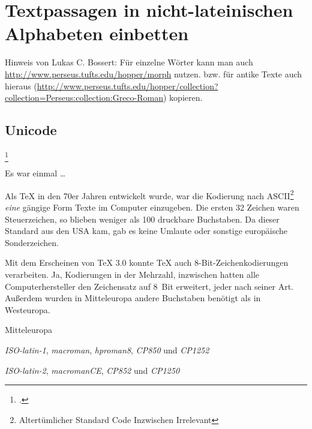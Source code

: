 \chapter{Textpassagen in nicht-lateinischen Alphabeten einbetten}

Hinweis von Lukas C. Bossert:
Für einzelne Wörter kann man auch \url{http://www.perseus.tufts.edu/hopper/morph} nutzen.
bzw. für antike Texte auch hieraus (\url{http://www.perseus.tufts.edu/hopper/collection?collection=Perseus:collection:Greco-Roman}) kopieren.

\section{Unicode}\label{sec:unicode}
\footcite{kielhorn:dtk2014}


\noindent Es war einmal \dots

Als \TeX{} in den 70er Jahren entwickelt wurde, war die Kodierung nach 
ASCII\footnote{Altertümlicher Standard Code Inzwischen Irrelevant} \emph{eine}
gängige Form Texte im Computer einzugeben. 
Die ersten 32 Zeichen waren Steuerzeichen, so blieben weniger als 100 druckbare Buchstaben.
Da dieser Standard aus den USA kam, gab es keine Umlaute oder sonstige europäische
Sonderzeichen.

Mit dem Erscheinen von \TeX{} 3.0 konnte \TeX{} auch 8-Bit-Zeichenkodierungen verarbeiten.
Ja, Kodierungen in der Mehrzahl, inzwischen hatten alle Computerhersteller den Zeichensatz
auf 8~Bit erweitert, jeder nach seiner Art. Außerdem wurden in Mitteleuropa andere Buchstaben
benötigt als in Westeuropa.

\begin{labeling}{Mitteleuropa}
    \item[Westeuropa:]
      \emph{ISO-latin-1}, \emph{macroman}, \emph{hproman8}, \emph{CP850} und \emph{CP1252}
    \item[Mitteleuropa:]
      \emph{ISO-latin-2}, \emph{macromanCE}, \emph{CP852} und \emph{CP1250}
\end{labeling}

